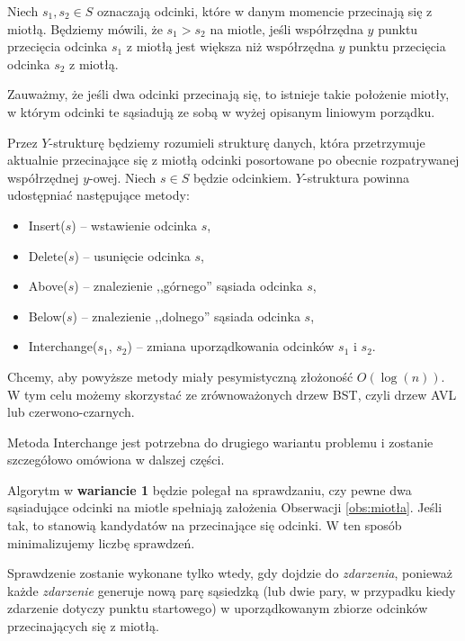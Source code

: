 Niech $s_1, s_2 \in S$ oznaczają odcinki, które w danym momencie przecinają się 
z miotłą. Będziemy mówili, że $s_1 > s_2$ na miotle,
jeśli współrzędna $y$ punktu przecięcia odcinka $s_1$ z miotłą jest większa 
niż współrzędna $y$ punktu przecięcia odcinka $s_2$ z miotłą.

\begin{obs}
	\label{obs:miotła}
	Zauważmy, że jeśli dwa odcinki przecinają się, to istnieje takie położenie
	miotły, w którym odcinki te sąsiadują ze sobą w wyżej opisanym liniowym porządku.
\end{obs} 

Przez $Y$-strukturę będziemy rozumieli strukturę danych, która przetrzymuje aktualnie przecinające się 
z miotłą odcinki posortowane po obecnie rozpatrywanej współrzędnej $y$-owej. Niech $s \in S$ będzie odcinkiem. $Y$-struktura 
powinna udostępniać następujące metody:
\begin{itemize}
	\item Insert($s$) -- wstawienie odcinka $s$,
	\item Delete($s$) -- usunięcie odcinka $s$,
	\item Above($s$) -- znalezienie ,,górnego'' sąsiada odcinka $s$,
	\item Below($s$) -- znalezienie ,,dolnego'' sąsiada odcinka $s$,

	\item Interchange($s_1$, $s_2$) -- zmiana uporządkowania odcinków $s_1$ i $s_2$.
\end{itemize}
Chcemy, aby powyższe metody miały pesymistyczną złożoność $O(\log(n))$. W tym celu możemy skorzystać ze zrównoważonych drzew BST, czyli
drzew AVL lub czerwono-czarnych.

Metoda Interchange jest potrzebna do drugiego wariantu 
problemu i zostanie szczegółowo omówiona w dalszej części.

Algorytm w \textbf{wariancie 1} będzie polegał na sprawdzaniu, 
czy pewne dwa sąsiadujące odcinki na miotle spełniają założenia 
Obserwacji \ref{obs:miotła}. Jeśli tak, to stanowią kandydatów na przecinające 
się odcinki. W ten sposób minimalizujemy liczbę sprawdzeń.

Sprawdzenie zostanie wykonane tylko wtedy, gdy dojdzie do \textit{zdarzenia},
ponieważ każde \textit{zdarzenie} generuje nową parę sąsiedzką 
(lub dwie pary, w przypadku kiedy zdarzenie dotyczy punktu startowego) 
w uporządkowanym zbiorze odcinków przecinających się z miotłą.


